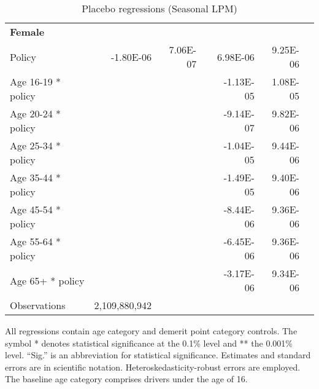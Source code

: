 \begin{table}
\begin{tabular}{l r r l r r l}
\hline 

\textbf{Female} \\ 

Policy             &  -1.80E-06        &  7.06E-07       &            &  6.98E-06        &  9.25E-06       &            \\ 
Age 16-19 * policy           & & &  &  -1.13E-05        &  1.08E-05       &            \\ 
Age 20-24 * policy           & & &  &  -9.14E-07        &  9.82E-06       &            \\ 
Age 25-34 * policy           & & &  &  -1.04E-05        &  9.44E-06       &            \\ 
Age 35-44 * policy           & & &  &  -1.49E-05        &  9.40E-06       &            \\ 
Age 45-54 * policy           & & &  &  -8.44E-06        &  9.36E-06       &            \\ 
Age 55-64 * policy           & & &  &  -6.45E-06        &  9.36E-06       &            \\ 
Age 65+ * policy           & & &  &  -3.17E-06        &  9.34E-06       &            \\ 
Observations & 2,109,880,942  \\ 


\hline 

\end{tabular} 
\caption{Placebo regressions (Seasonal LPM)} 
All regressions contain age category and demerit point category controls. 
The symbol * denotes statistical significance at the 0.1\% level 
and ** the 0.001\% level. 
``Sig.'' is an abbreviation for statistical significance. 
Estimates and standard errors are in scientific notation. 
Heteroskedasticity-robust errors are employed. 
The baseline age category comprises drivers under the age of 16. 
\label{tab:seas_placebo_regs} 
\end{table} 
 
